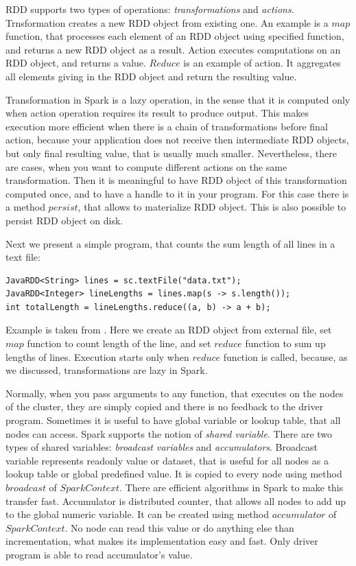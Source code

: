 RDD supports two types of operations: \textit{transformations}  and \textit{actions}.
Trnsformation creates a new RDD object from existing one.
An example is a $map$ function, that processes each element of an RDD object using specified function, and returns a new RDD object as a result.
Action executes computations on an RDD object, and returns a value.
$Reduce$ is an example of action.
It aggregates all elements giving in the RDD object and return the resulting value.

Transformation in Spark is a lazy operation, in the sense that it is computed only when action operation requires its result to produce output.
This makes execution more efficient when there is a chain of transformations before final action, because your application does not receive then intermediate RDD objects, but only final resulting value, that is usually much smaller.
Nevertheless, there are cases, when you want to compute different actions on the same transformation.
Then it is meaningful to have RDD object of this transformation computed once, and to have a handle to it in your program.
For this case there is a method $persist$, that allows to materialize RDD object.
This is also possible to persist RDD object on disk.

Next we present a simple program, that counts the sum length of all lines in a text file:
\begin{verbatim}
JavaRDD<String> lines = sc.textFile("data.txt");
JavaRDD<Integer> lineLengths = lines.map(s -> s.length());
int totalLength = lineLengths.reduce((a, b) -> a + b);
\end{verbatim}
Example is taken from \cite{Spark1}.
Here we create an RDD object from external file, set $map$ function to count length of the line, and set $reduce$ function to sum up lengths of lines.
Execution starts only when $reduce$ function is called, because, as we discussed, transformations are lazy in Spark.

Normally, when you pass arguments to any function, that executes on the nodes of the cluster, they are simply copied and there is no feedback to the driver program.
Sometimes it is useful to have global variable or lookup table, that all nodes can access.
Spark supports the notion of \textit{shared variable}.
There are two types of shared variables: \textit{broadcast variables}  and \textit{accumulators}.
Broadcast variable represents readonly value or dataset, that is useful for all nodes as a lookup table or global predefined value.
It is copied to every node using method $broadcast$ of $SparkContext$.
There are efficient algorithms in Spark to make this transfer fast.
Accumulator is distributed counter, that allows all nodes to add up to the global numeric variable.
It can be created using method $accumulator$ of $SparkContext$.
No node can read this value or do anything else than incrementation, what makes its implementation easy and fast.
Only driver program is able to read accumulator's value.

